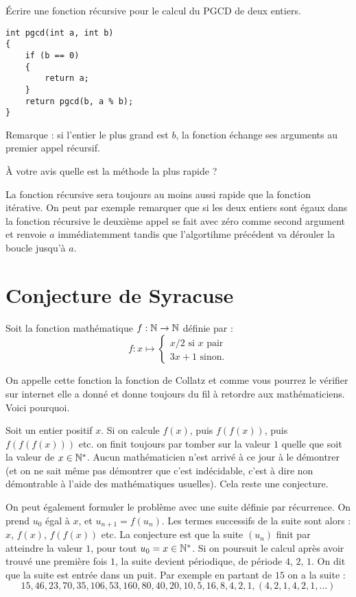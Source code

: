 \begin{newenu}
\begin{correction}
 \end{correction}
\item  Écrire une fonction récursive pour le calcul du PGCD de deux
  entiers.
  \begin{correction}
\begin{verbatim}
int pgcd(int a, int b)
{
    if (b == 0) 
    {
        return a;
    }
    return pgcd(b, a % b);
}
\end{verbatim}
Remarque : si l'entier le plus grand est $b$, la fonction échange ses arguments au premier appel récursif. 
  \end{correction}
\item À votre avis quelle est la méthode la plus rapide ?
  \begin{correction}
La fonction récursive sera toujours au moins aussi rapide que la fonction itérative. On peut par exemple remarquer que si les deux entiers sont égaux dans la fonction récursive le deuxième appel se fait avec zéro comme second argument et renvoie $a$ immédiatemment tandis que l'algortihme précédent va dérouler la boucle jusqu'à $a$.
  \end{correction}
\end{newenu}


\section{Conjecture de Syracuse}

Soit la fonction mathématique $f : \mathbb{N}\to \mathbb{N}$ définie par : 
\[
f: x\mapsto
\begin{cases}
x/2  \text{ si $x$ pair}\\
3x + 1 \text{ sinon.}
\end{cases}
\]

On appelle cette fonction la fonction de Collatz et comme vous pourrez le vérifier sur internet elle a donné et donne toujours du fil à retordre aux mathématiciens. Voici pourquoi.

Soit un entier positif $x$. Si on calcule $f(x)$, puis $f(f(x))$, puis
$f(f(f(x)))$ etc. on finit toujours par tomber sur la valeur $1$
quelle que soit la valeur de $x \in\mathbb{N}^{\ast}$. Aucun mathématicien
n'est arrivé à ce jour à le démontrer (et on ne sait même pas
démontrer que c'est indécidable, c'est à dire non démontrable à l'aide
des mathématiques usuelles). Cela reste une conjecture.

On peut également formuler le problème avec une suite définie par
récurrence. On prend $u_0$ égal à $x$, et $u_{n + 1} = f(u_{n})$. Les
termes successifs de la suite sont alors : $x$, $f(x)$, $f(f(x))$
etc. La conjecture est que la suite $(u_n)$ finit par atteindre la
valeur $1$, pour tout $u_0= x\in\mathbb{N}^{\ast}$.  Si on poursuit le
calcul après avoir trouvé une première fois $1$, la
suite devient périodique, de période $4$, $2$, $1$. On dit que la
suite est entrée dans un puit. Par exemple en partant de $15$ on a la
suite :
\[15, 46, 23, 70, 35, 106, 53, 160, 80, 40, 20, 10, 5, 16, 8, 4, 2, 1, (4, 2, 1, 4, 2, 1, \ldots)\]

